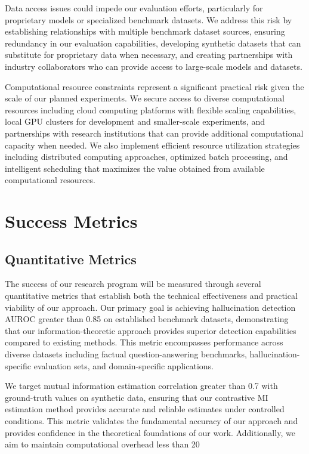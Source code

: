 \documentclass[11pt, oneside]{book}
\theoremstyle{plain}
\theoremstyle{definition}
\theoremstyle{remark}
\begin{document}
Data access issues could impede our evaluation efforts, particularly for proprietary models or specialized benchmark datasets. We address this risk by establishing relationships with multiple benchmark dataset sources, ensuring redundancy in our evaluation capabilities, developing synthetic datasets that can substitute for proprietary data when necessary, and creating partnerships with industry collaborators who can provide access to large-scale models and datasets.

Computational resource constraints represent a significant practical risk given the scale of our planned experiments. We secure access to diverse computational resources including cloud computing platforms with flexible scaling capabilities, local GPU clusters for development and smaller-scale experiments, and partnerships with research institutions that can provide additional computational capacity when needed. We also implement efficient resource utilization strategies including distributed computing approaches, optimized batch processing, and intelligent scheduling that maximizes the value obtained from available computational resources.

\section{Success Metrics}

\subsection{Quantitative Metrics}

The success of our research program will be measured through several quantitative metrics that establish both the technical effectiveness and practical viability of our approach. Our primary goal is achieving hallucination detection AUROC greater than 0.85 on established benchmark datasets, demonstrating that our information-theoretic approach provides superior detection capabilities compared to existing methods. This metric encompasses performance across diverse datasets including factual question-answering benchmarks, hallucination-specific evaluation sets, and domain-specific applications.

We target mutual information estimation correlation greater than 0.7 with ground-truth values on synthetic data, ensuring that our contrastive MI estimation method provides accurate and reliable estimates under controlled conditions. This metric validates the fundamental accuracy of our approach and provides confidence in the theoretical foundations of our work. Additionally, we aim to maintain computational overhead less than 20%
\end{document}
